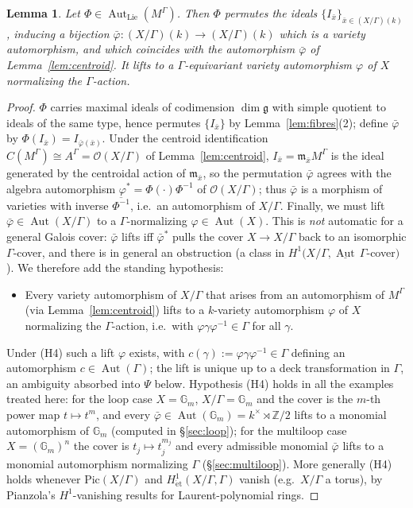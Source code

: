 \documentclass{amsart}
\newtheorem{lemma}{Lemma}
\theoremstyle{definition}
\DeclareMathOperator{\Aut}{Aut}
\newcommand{\Gm}{\mathbb{G}_m}
\newcommand{\g}{\mathfrak{g}}
\newcommand{\OO}{\mathcal{O}}
\newcommand{\Z}{\mathbb{Z}}
\newcommand{\M}{M}
\begin{document}
\begin{lemma}\label{lem:varietypart}
Let $\Phi\in\Aut_{\mathrm{Lie}}(\M^\Gamma)$.  Then $\Phi$ permutes the
ideals $\{I_{\bar x}\}_{\bar x\in (X/\Gamma)(k)}$, inducing a bijection
$\bar\varphi\colon(X/\Gamma)(k)\to(X/\Gamma)(k)$ which is a variety
automorphism, and which coincides with the automorphism $\bar\varphi$ of
Lemma~\ref{lem:centroid}.  It lifts to a $\Gamma$-equivariant variety
automorphism $\varphi$ of $X$ normalizing the $\Gamma$-action.
\end{lemma}
\begin{proof}
$\Phi$ carries maximal ideals of codimension $\dim\g$ with simple quotient
to ideals of the same type, hence permutes $\{I_{\bar x}\}$ by
Lemma~\ref{lem:fibres}(2); define $\bar\varphi$ by
$\Phi(I_{\bar x})=I_{\bar\varphi(\bar x)}$.  Under the centroid
identification $C(\M^\Gamma)\cong A^\Gamma=\OO(X/\Gamma)$ of
Lemma~\ref{lem:centroid}, $I_{\bar x}=\mathfrak m_{\bar x}\M^\Gamma$ is the
ideal generated by the centroidal action of $\mathfrak m_{\bar x}$, so the
permutation $\bar\varphi$ agrees with the algebra automorphism
$\varphi^*=\Phi(\cdot)\Phi^{-1}$ of $\OO(X/\Gamma)$; thus $\bar\varphi$ is
a morphism of varieties with inverse $\overline{\Phi^{-1}}$, i.e.\ an
automorphism of $X/\Gamma$.  Finally, we must lift $\bar\varphi\in\Aut(X/\Gamma)$ to a
$\Gamma$-normalizing $\varphi\in\Aut(X)$.  This is \emph{not} automatic for
a general Galois cover: $\bar\varphi$ lifts iff $\bar\varphi^*$ pulls the
cover $X\to X/\Gamma$ back to an isomorphic $\Gamma$-cover, and there is in
general an obstruction (a class in $H^1(X/\Gamma,\underline{\Aut}\,\Gamma$-cover$)$).
We therefore add the standing hypothesis:
\begin{itemize}
\item[(H4)] Every variety automorphism of $X/\Gamma$ that arises from an
automorphism of $\M^\Gamma$ (via Lemma~\ref{lem:centroid}) lifts to a
$k$-variety automorphism $\varphi$ of $X$ normalizing the $\Gamma$-action,
i.e.\ with $\varphi\gamma\varphi^{-1}\in\Gamma$ for all $\gamma$.
\end{itemize}
Under (H4) such a lift $\varphi$ exists, with
$c(\gamma):=\varphi\gamma\varphi^{-1}\in\Gamma$ defining an automorphism
$c\in\Aut(\Gamma)$; the lift is unique up to a deck transformation in
$\Gamma$, an ambiguity absorbed into $\Psi$ below.  Hypothesis (H4) holds
in all the examples treated here: for the loop case $X=\Gm$, $X/\Gamma=\Gm$
and the cover is the $m$-th power map $t\mapsto t^m$, and every
$\bar\varphi\in\Aut(\Gm)=k^\times\rtimes\Z/2$ lifts to a monomial
automorphism of $\Gm$ (computed in \S\ref{sec:loop}); for the multiloop
case $X=(\Gm)^n$ the cover is $t_j\mapsto t_j^{m_j}$ and every admissible
monomial $\bar\varphi$ lifts to a monomial automorphism normalizing
$\Gamma$ (\S\ref{sec:multiloop}).  More generally (H4) holds whenever
$\mathrm{Pic}(X/\Gamma)$ and $H^1_{\mathrm{\acute et}}(X/\Gamma,\Gamma)$
vanish (e.g.\ $X/\Gamma$ a torus), by Pianzola's $H^1$-vanishing results
for Laurent-polynomial rings.
\end{proof}
\end{document}
